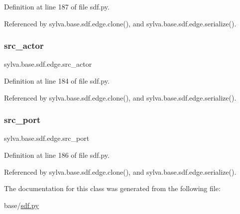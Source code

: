 Definition at line 187 of file sdf.\+py.



Referenced by sylva.\+base.\+sdf.\+edge.\+clone(), and sylva.\+base.\+sdf.\+edge.\+serialize().

\mbox{\label{classsylva_1_1base_1_1sdf_1_1edge_adab5e4935ad5cdd09b2c8859ea183513}} 
\subsubsection{\texorpdfstring{src\+\_\+actor}{src\_actor}}
{\footnotesize\ttfamily sylva.\+base.\+sdf.\+edge.\+src\+\_\+actor}



Definition at line 184 of file sdf.\+py.



Referenced by sylva.\+base.\+sdf.\+edge.\+clone(), and sylva.\+base.\+sdf.\+edge.\+serialize().

\mbox{\label{classsylva_1_1base_1_1sdf_1_1edge_a8df512cfa9966c1bf78dc8fb584aefce}} 
\subsubsection{\texorpdfstring{src\+\_\+port}{src\_port}}
{\footnotesize\ttfamily sylva.\+base.\+sdf.\+edge.\+src\+\_\+port}



Definition at line 186 of file sdf.\+py.



Referenced by sylva.\+base.\+sdf.\+edge.\+clone(), and sylva.\+base.\+sdf.\+edge.\+serialize().



The documentation for this class was generated from the following file\+:\begin{DoxyCompactItemize}
\item 
base/\hyperlink{sdf_8py}{sdf.\+py}\end{DoxyCompactItemize}

